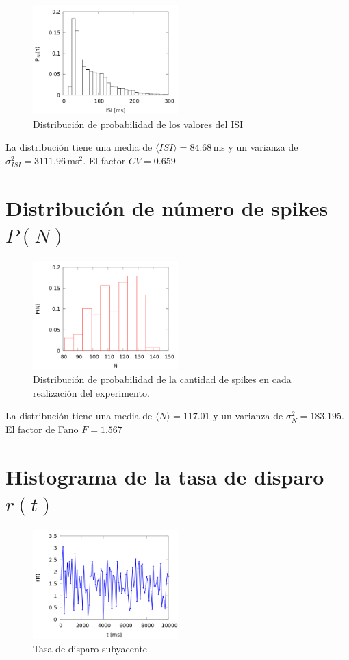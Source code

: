 \begin{figure}[H]
	\centering
	\includegraphics[width=0.5\textwidth]{../Graficos/p_isi.png}
	\caption{Distribución de probabilidad de los valores del ISI}
	\end{figure}


La distribución tiene una media de $\langle ISI \rangle = 84.68\,$ms y un varianza de $\sigma^2_{ISI}=3111.96\,$ms$^2$.
El factor $CV=0.659$


\section*{Distribución de número de spikes \texorpdfstring{$P(N)$}{}}

\begin{figure}[H]
	\centering
	\includegraphics[width=0.5\textwidth]{../Graficos/p_N.png}
	\caption{Distribución de probabilidad de la cantidad de spikes en cada realización del experimento.}
\end{figure}


La distribución tiene una media de $\langle N \rangle = 117.01$ y un varianza de $\sigma^2_{N}=183.195$.
El factor de Fano $F=1.567$


\section*{Histograma de la tasa de disparo \texorpdfstring{$r(t)$}{}}


\begin{figure}[H]
	\centering
	\includegraphics[width=0.5\textwidth]{../Graficos/r_t.png}
	\caption{Tasa de disparo subyacente}
\end{figure}

